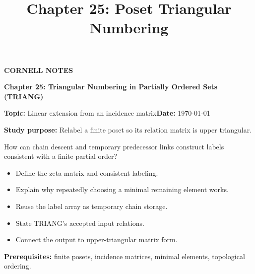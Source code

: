 \documentclass[10pt,letterpaper]{article}
\title{Chapter 25: Poset Triangular Numbering}
\author{}
\date{}
\begin{document}
\maketitle
\begin{tcolorbox}[colback=Paper,colframe=Ink]{\small\bfseries\color{Teal}CORNELL NOTES}\par{\LARGE\bfseries Chapter 25: Triangular Numbering in Partially Ordered Sets (TRIANG)}\par\medskip\textbf{Topic:} Linear extension from an incidence matrix\hfill\textbf{Date:} \today\par\textbf{Study purpose:} Relabel a finite poset so its relation matrix is upper triangular.\end{tcolorbox}
\begin{tcolorbox}[colback=Teal!5,colframe=Teal,title=Essential question]How can chain descent and temporary predecessor links construct labels consistent with a finite partial order?\end{tcolorbox}
\begin{tcolorbox}[colback=white,colframe=Mist,title=Learning objectives]\begin{itemize}\item Define the zeta matrix and consistent labeling.\item Explain why repeatedly choosing a minimal remaining element works.\item Reuse the label array as temporary chain storage.\item State TRIANG's accepted input relations.\item Connect the output to upper-triangular matrix form.\end{itemize}\textbf{Prerequisites:} finite posets, incidence matrices, minimal elements, topological ordering.\end{tcolorbox}
\end{document}
